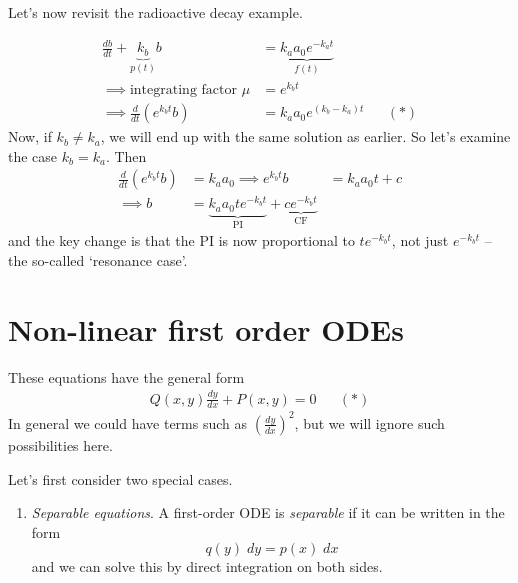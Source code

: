 \documentclass{../../template/note}
\begin{document}
    Let's now revisit the radioactive decay example.

    \begin{example}
        \begin{align*}
            \frac{db}{dt} + \underbrace{k_b}_{p(t)}b &= \underbrace{k_aa_0e^{-k_at}}_{f(t)} \\
            \implies \text{integrating factor } \mu &= e^{k_bt} \\
            \implies \frac{d}{dt}\left(e^{k_bt}b\right) &= k_aa_0e^{(k_b-k_a)t} && (*)
        \end{align*}
        Now, if \(k_b \neq k_a\), we will end up with the same solution as earlier. So let's examine the case \(k_b = k_a\). Then
        \begin{align*}
            \frac{d}{dt}\left(e^{k_bt}b\right) &= k_aa_0
            \implies e^{k_bt}b &= k_aa_0t + c \\
            \implies b &= \underbrace{k_aa_0te^{-k_bt}}_{\text{PI}} + \underbrace{ce^{-k_bt}}_{\text{CF}}
        \end{align*}
        and the key change is that the PI is now proportional to \(te^{-k_bt}\), not just \(e^{-k_bt}\) -- the so-called `resonance case'.        
    \end{example}
    

    \section{Non-linear first order ODEs}
    
    These equations have the general form
    \begin{align*}
        Q(x, y) \frac{dy}{dx} + P(x, y) = 0 && (*)
    \end{align*}
    In general we could have terms such as \(\left(\frac{dy}{dx}\right)^2\), but we will ignore such possibilities here.

    Let's first consider two special cases.

    \begin{enumerate}
        \item \emph{Separable equations}. A first-order ODE is \emph{separable} if it can be written in the form
        \[
            q(y) \; dy = p(x) \; dx
        \]
        and we can solve this by direct integration on both sides.
    \end{enumerate}
\end{document}

